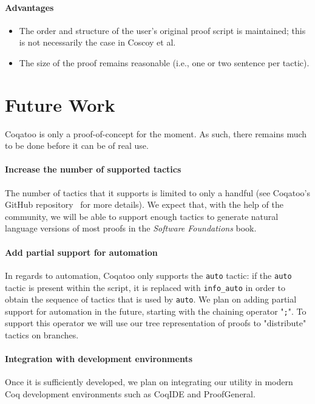 \documentclass[sigplan,screen,9pt]{acmart}
\begin{document}
\paragraph{Advantages}
\begin{itemize}
  \item{The order and structure of the user's original proof script is maintained; this is not necessarily the case in Coscoy et al.}
  \item{The size of the proof remains reasonable (i.e., one or two sentence per tactic).}
\end{itemize}

\section{Future Work}
Coqatoo is only a proof-of-concept for the moment. As such, there remains much to be done before it can be of real use. 

\paragraph{Increase the number of supported tactics}
The number of tactics that it supports is limited to only a handful (see Coqatoo's GitHub repository~\cite{Coqatoo} for more details). We expect that, with the help of the community, we will be able to support enough tactics to generate natural language versions of most proofs in the \emph{Software Foundations} book.

\paragraph{Add partial support for automation}
In regards to automation, Coqatoo only supports the \lstinline{auto} tactic: if the \lstinline{auto} tactic is present within the script, it is replaced with \lstinline{info_auto} in order to obtain the sequence of tactics that is used by \lstinline{auto}. We plan on adding partial support for automation in the future, starting with the chaining operator "\lstinline{;}". To support this operator we will use our tree representation of proofs to "distribute" tactics on branches.

\paragraph{Integration with development environments} Once it is sufficiently developed, we plan on integrating our utility in modern Coq development environments such as CoqIDE and ProofGeneral.
\end{document}
